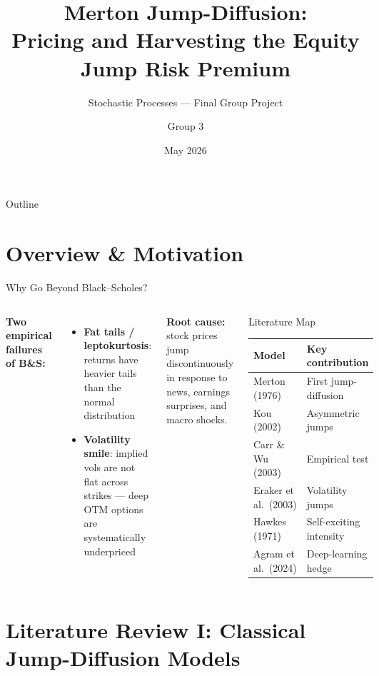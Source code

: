 \documentclass[aspectratio=169,10pt]{beamer}
\title[Jump-Diffusion: Pricing \& Jump Risk Premium]{%
  Merton Jump-Diffusion:\\[2pt]
  Pricing and Harvesting the Equity Jump Risk Premium}
\subtitle{Stochastic Processes --- Final Group Project}
\author[Group 3]{Group 3}
\date{May 2026}
\begin{document}
{
\begin{frame}[plain]
  \titlepage
\end{frame}
}


\begin{frame}{Outline}
\tableofcontents[sectionstyle=show,subsectionstyle=hide]
\end{frame}


\section{Overview \& Motivation}


\begin{frame}{Why Go Beyond Black--Scholes?}
\begin{columns}[T]
\textbf{Two empirical failures of B\&S:}
\begin{itemize}\itemsep2pt
  \item \textbf{Fat tails / leptokurtosis}: returns have heavier tails than the normal distribution
  \item \textbf{Volatility smile}: implied vols are not flat across strikes --- deep OTM options are systematically underpriced
\end{itemize}
\medskip
\textbf{Root cause:} stock prices \alert{jump} discontinuously in response to news, earnings surprises, and macro shocks.

\begin{block}{Literature Map}
\footnotesize
\begin{tabular}{ll}
\toprule
Model & Key contribution \\
\midrule
Merton (1976)   & First jump-diffusion \\
Kou (2002)      & Asymmetric jumps \\
Carr \& Wu (2003) & Empirical test \\
Eraker et al.\ (2003) & Volatility jumps \\
Hawkes (1971)   & Self-exciting intensity \\
Agram et al.\ (2024) & Deep-learning hedge \\
\bottomrule
\end{tabular}
\end{block}
\end{columns}
\end{frame}


\section{Literature Review I: Classical Jump-Diffusion Models}
\end{document}
